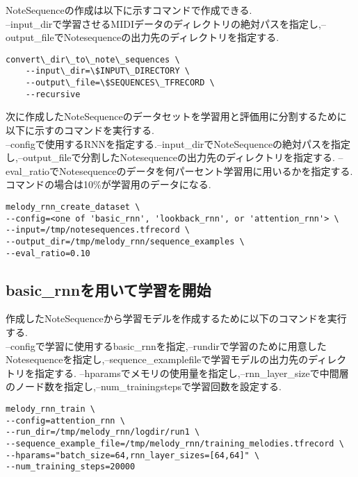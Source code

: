 NoteSequenceの作成は以下に示すコマンドで作成できる.\\
--input\_dirで学習させるMIDIデータのディレクトリの絶対パスを指定し,--output\_fileでNotesequenceの出力先のディレクトリを指定する.\\
\begin{lstlisting}[basicstyle=\ttfamily\footnotesize,frame=single]
    convert\_dir\_to\_note\_sequences \
    --input\_dir=\$INPUT\_DIRECTORY \
    --output\_file=\$SEQUENCES\_TFRECORD \
    --recursive
\end{lstlisting}
次に作成したNoteSequenceのデータセットを学習用と評価用に分割するために以下に示すのコマンドを実行する.\\
--configで使用するRNNを指定する.--input\_dirでNoteSequenceの絶対パスを指定し,--output\_fileで分割したNotesequenceの出力先のディレクトリを指定する.
--eval\_ratioでNotesequenceのデータを何パーセント学習用に用いるかを指定する.コマンドの場合は10\%が学習用のデータになる.
\begin{lstlisting}[basicstyle=\ttfamily\footnotesize,frame=single]
melody_rnn_create_dataset \
--config=<one of 'basic_rnn', 'lookback_rnn', or 'attention_rnn'> \
--input=/tmp/notesequences.tfrecord \
--output_dir=/tmp/melody_rnn/sequence_examples \
--eval_ratio=0.10
\end{lstlisting}
\newpage
\subsection{basic\_rnnを用いて学習を開始}
作成したNoteSequenceから学習モデルを作成するために以下のコマンドを実行する.\\
--configで学習に使用するbasic\_rnnを指定,--rundirで学習のために用意したNotesequenceを指定し,--sequence\_examplefileで学習モデルの出力先のディレクトリを指定する.
--hparamsでメモリの使用量を指定し,--rnn\_layer\_sizeで中間層のノード数を指定し,--num\_trainingstepsで学習回数を設定する.\\
\begin{lstlisting}[basicstyle=\ttfamily\footnotesize,frame=single]
melody_rnn_train \
--config=attention_rnn \
--run_dir=/tmp/melody_rnn/logdir/run1 \
--sequence_example_file=/tmp/melody_rnn/training_melodies.tfrecord \
--hparams="batch_size=64,rnn_layer_sizes=[64,64]" \
--num_training_steps=20000
\end{lstlisting}
